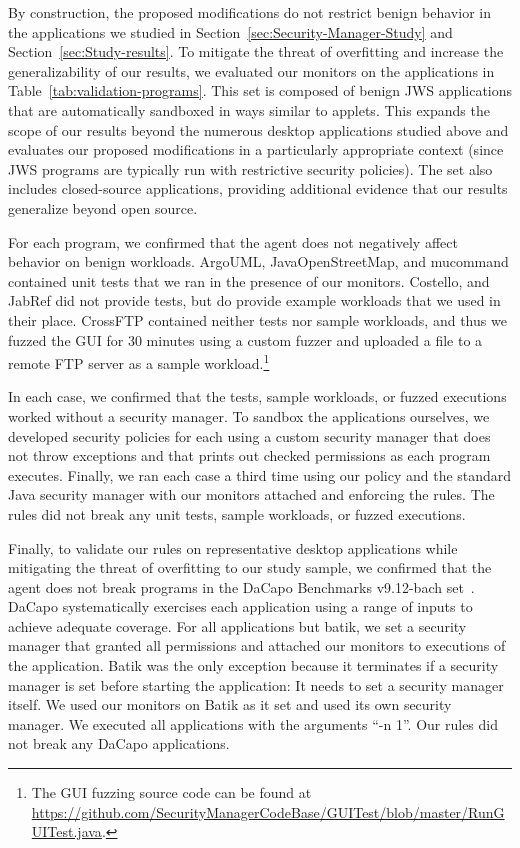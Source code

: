 \documentclass{sig-alternate}
\begin{document}
By construction, the proposed modifications do not restrict
benign behavior in the applications we studied in
Section~\ref{sec:Security-Manager-Study} and Section~\ref{sec:Study-results}.
To mitigate the threat of overfitting and increase the generalizability of our results, we 
evaluated our monitors on the applications
in Table~\ref{tab:validation-programs}. This set is composed of benign JWS
applications that are automatically sandboxed in ways similar to applets.  This
expands the scope of our results beyond the numerous desktop applications
studied above and evaluates our proposed modifications in a particularly
appropriate context (since JWS programs are typically run with restrictive
security policies).  The set also includes closed-source applications,
providing additional evidence that our results generalize beyond open
source.

For each program, we confirmed that the agent does not negatively affect
behavior on benign workloads. ArgoUML, JavaOpenStreetMap, and mucommand 
contained unit tests that we ran in the presence of our monitors. Costello, and
JabRef did not provide tests, but do provide example workloads that we used
in their place. CrossFTP contained neither tests nor sample workloads, and thus
we fuzzed the GUI for 30 minutes using a custom fuzzer and uploaded a file to a
remote FTP server as a sample workload.\footnote{The GUI fuzzing source code can
  be found at
  \url{https://github.com/SecurityManagerCodeBase/GUITest/blob/master/RunGUITest.java}.} 

In each case, we confirmed that the tests, sample workloads, or fuzzed executions
worked without a security manager. To sandbox the applications ourselves,
we developed security policies for each using a custom security manager that does not throw exceptions 
and that prints out checked permissions as each program executes. Finally, we
ran each case a third time 
using our policy and the standard Java security manager with our monitors
attached and enforcing the rules. The rules did not break any unit tests, sample
workloads, or fuzzed executions.

Finally, to validate our rules on representative desktop applications while
mitigating the threat of overfitting to our study sample, we confirmed that the
agent does not break programs in the DaCapo Benchmarks v9.12-bach set~\cite{dacapo}. 
DaCapo systematically exercises each application using a range of inputs to achieve
adequate coverage. For all
applications but batik, we set a security manager that granted all
permissions and attached our monitors to executions of the application. Batik was the only
exception because it terminates if a security manager is set before starting the application: It needs to set a security manager itself. We used our monitors on Batik as it set and used its
own security manager.
 We executed all applications with the arguments ``-n 1''. 
Our rules did not break any DaCapo applications.
\end{document}
